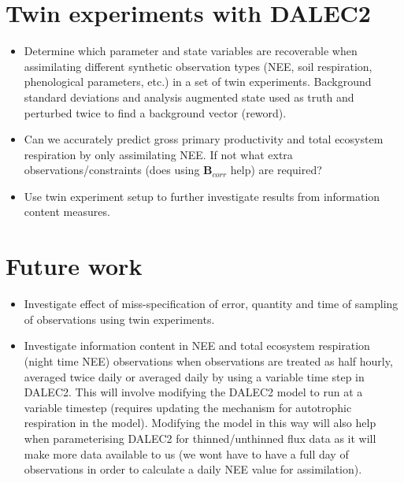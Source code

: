 \documentclass[11pt]{article}
\begin{document}
\section{Twin experiments with DALEC2}
\begin{itemize}
\item Determine which parameter and state variables are recoverable when assimilating different synthetic observation types (NEE, soil respiration, phenological parameters, etc.) in a set of twin experiments. Background standard deviations and analysis augmented state used as truth and perturbed twice to find a background vector (reword). 

\item Can we accurately predict gross primary productivity and total ecosystem respiration by only assimilating NEE. If not what extra observations/constraints (does using $\textbf{B}_{corr}$ help) are required?

\item Use twin experiment setup to further investigate results from information content measures.
\end{itemize}

\section{Future work}
\begin{itemize}
\item Investigate effect of miss-specification of error, quantity and time of sampling of observations using twin experiments.

\item Investigate information content in NEE and total ecosystem respiration (night time NEE) observations when observations are treated as half hourly, averaged twice daily or averaged daily by using a variable time step in DALEC2. This will involve modifying the DALEC2 model to run at a variable timestep (requires updating the mechanism for autotrophic respiration in the model). Modifying the model in this way will also help when parameterising DALEC2 for thinned/unthinned flux data as it will make more data available to us (we wont have to have a full day of observations in order to calculate a daily NEE value for assimilation). 
\end{itemize}

{}
\end{document}
